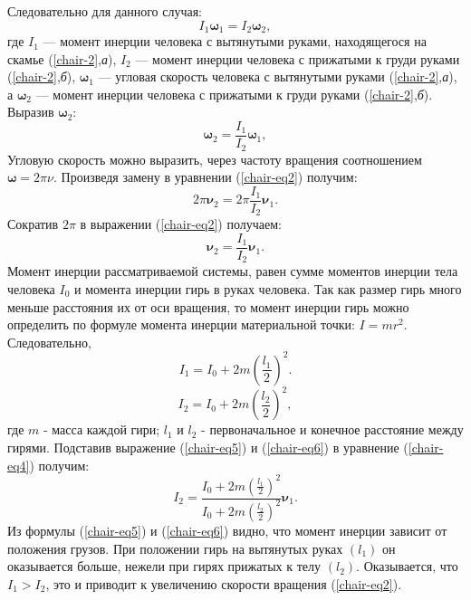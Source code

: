 \documentclass[14pt,a4paper,oneside]{extarticle}	%
\begin{document}
 Следовательно для данного случая:
 \begin{equation}\label{chair-eq1}
 I_{1}\bm{\omega}_{1} =  I_{2}\bm{\omega}_{2},
 \end{equation} 
 где $ I_{1}  $ — момент инерции человека с вытянутыми руками, находящегося на скамье (\ref{chair-2},\textit{а}), $ I_{2}  $ — момент инерции человека с прижатыми к груди руками (\ref{chair-2},\textit{б}), $ \bm{\omega}_{1} $ — угловая скорость человека с вытянутыми руками (\ref{chair-2},\textit{а}), а $ \bm{\omega}_{2}  $ — момент инерции человека с прижатыми к груди руками (\ref{chair-2},\textit{б}).
 Выразив $ \bm{\omega}_{2} $:
 \begin{equation}\label{chair-eq2}
 \bm{\omega}_{2} =  \frac{I_{1}}{I_{2}}\bm{\omega}_{1},
 \end{equation}
 Угловую скорость можно выразить, через частоту вращения соотношением $ \bm{\omega} = 2\pi \nu  $.
 Произведя замену в уравнении (\ref{chair-eq2}) получим:
 \begin{equation}\label{chair-eq3}
 2\pi \bm{\nu}_{2} = 2\pi \frac{I_{1}}{I_{2}}\bm{\nu}_{1}.
 \end{equation}
 Сократив $  2\pi $ в выражении (\ref{chair-eq2}) получаем:
 \begin{equation}\label{chair-eq4}
 \bm{\nu}_{2} = \frac{I_{1}}{I_{2}}\bm{\nu}_{1}.
 \end{equation}
Момент инерции рассматриваемой системы, равен сумме моментов инерции тела человека $ I_{0} $ и момента инерции гирь в руках человека. Так как размер гирь много меньше расстояния их от оси вращения, то момент инерции гирь можно определить по формуле момента инерции материальной точки: $ I = mr^{2} $.
Следовательно,
\begin{equation}\label{chair-eq5}
I_{1} = I_{0} + 2m \left(\frac{l_{1}}{2} \right)^{2}.
\end{equation}
\begin{equation}\label{chair-eq6}
I_{2} = I_{0} + 2m \left(\frac{l_{2}}{2} \right)^{2} ,
\end{equation}
где $ m $ - масса каждой гири; $ l_{1} $ и $ l_{2} $ - первоначальное и конечное  расстояние между гирями.
Подставив выражение  (\ref{chair-eq5}) и  (\ref{chair-eq6}) в уравнение (\ref{chair-eq4}) получим:
\begin{equation}\label{chair-eq7}
I_{2} =  \frac{I_{0} + 2m \left(\frac{l_{1}}{2} \right)^{2}}{I_{0} + 2m \left(\frac{l_{2}}{2} \right)^{2}}\bm{\nu}_{1}.
\end{equation}
Из формулы  (\ref{chair-eq5}) и  (\ref{chair-eq6}) видно, что момент инерции зависит от положения грузов. 
При положении гирь на вытянутых руках $ (l_{1}) $ он оказывается больше, нежели при гирях прижатых к телу $ (l_{2}) $.
Оказывается, что $ I_{1} > I_{2} $, это и приводит к увеличению скорости вращения (\ref{chair-eq2}).
\newpage
\end{document}
